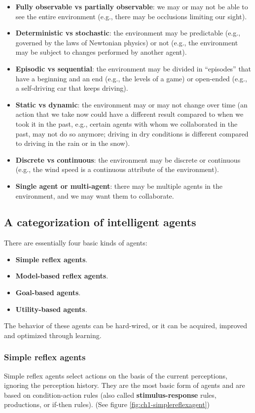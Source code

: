 \begin{itemize}
    \item \textbf{Fully observable vs partially observable}: we may or may not be able to see the entire environment (e.g., there may be occlusions limiting our sight).
    \item \textbf{Deterministic vs stochastic}: the environment may be predictable (e.g., governed by the laws of Newtonian physics) or not (e.g., the environment may be subject to changes performed by another agent).
    \item \textbf{Episodic vs sequential}: the environment may be divided in “episodes” that have a beginning and an end (e.g., the levels of a game) or open-ended (e.g., a self-driving car that keeps driving).
    \item \textbf{Static vs dynamic}: the environment may or may not change over time (an action that we take now could have a different result compared to when we took it in the past, e.g., certain agents with whom we collaborated in the past, may not do so anymore; driving in dry conditions is different compared to driving in the rain or in the snow).
    \item \textbf{Discrete vs continuous}: the environment may be discrete or continuous (e.g., the wind speed is a continuous attribute of the environment).
    \item \textbf{Single agent or multi-agent}: there may be multiple agents in the environment, and we may want them to collaborate.
\end{itemize}

\subsection{A categorization of intelligent agents}
There are essentially four basic kinds of agents:

\begin{itemize}
    \item \textbf{Simple reflex agents}.
    \item \textbf{Model-based reflex agents}.
    \item \textbf{Goal-based agents}.
    \item \textbf{Utility-based agents}.
\end{itemize}

The behavior of these agents can be hard-wired, or it can be acquired, improved and optimized through learning.

\subsubsection{Simple reflex agents}
Simple reflex agents select actions on the basis of the current perceptions, ignoring the perception history. They are the most basic form of agents and are based on condition-action rules (also called \textbf{stimulus-response} rules, productions, or if-then rules). (See figure \ref{fig:ch1-simplereflexagent})

